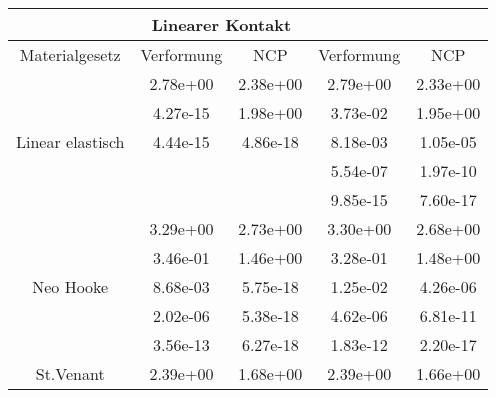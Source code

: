 \begin{table} 
\centering 
\begin{tabular}{c|cc|cc|} 
\cline{2-5} 
 & \multicolumn{2}{|c|}{Linearer Kontakt} &  \\ 
\hline 
\multicolumn{1}{|c|}{Materialgesetz} & \multicolumn{1}{c|}{Verformung} & \multicolumn{1}{c|}{NCP} & \multicolumn{1}{c|}{Verformung} & \multicolumn{1}{c|}{NCP} \\ 
\hline 
\multicolumn{1}{|c|}{\multirow{5}{*}{Linear elastisch}} &\multicolumn{1}{|c|}{  2.78e+00} & \multicolumn{1}{|c|}{  2.38e+00} & \multicolumn{1}{|c|}{  2.79e+00} & \multicolumn{1}{|c|}{  2.33e+00} \\ 
\multicolumn{1}{|c|}{} & \multicolumn{1}{|c|}{  4.27e-15} & \multicolumn{1}{|c|}{  1.98e+00} & \multicolumn{1}{|c|}{  3.73e-02} & \multicolumn{1}{|c|}{  1.95e+00} \\ 
\multicolumn{1}{|c|}{} & \multicolumn{1}{|c|}{  4.44e-15} & \multicolumn{1}{|c|}{  4.86e-18} & \multicolumn{1}{|c|}{  8.18e-03} & \multicolumn{1}{|c|}{  1.05e-05} \\ 
\multicolumn{1}{|c|}{} & \multicolumn{1}{|c|}{} & \multicolumn{1}{|c|}{} & \multicolumn{1}{|c|}{  5.54e-07} & \multicolumn{1}{|c|}{  1.97e-10} \\ 
\multicolumn{1}{|c|}{} & \multicolumn{1}{|c|}{} & \multicolumn{1}{|c|}{} & \multicolumn{1}{|c|}{  9.85e-15} & \multicolumn{1}{|c|}{  7.60e-17} \\ 
\hline 
\multicolumn{1}{|c|}{\multirow{5}{*}{Neo Hooke}} &\multicolumn{1}{|c|}{  3.29e+00} & \multicolumn{1}{|c|}{  2.73e+00} & \multicolumn{1}{|c|}{  3.30e+00} & \multicolumn{1}{|c|}{  2.68e+00} \\ 
\multicolumn{1}{|c|}{} & \multicolumn{1}{|c|}{  3.46e-01} & \multicolumn{1}{|c|}{  1.46e+00} & \multicolumn{1}{|c|}{  3.28e-01} & \multicolumn{1}{|c|}{  1.48e+00} \\ 
\multicolumn{1}{|c|}{} & \multicolumn{1}{|c|}{  8.68e-03} & \multicolumn{1}{|c|}{  5.75e-18} & \multicolumn{1}{|c|}{  1.25e-02} & \multicolumn{1}{|c|}{  4.26e-06} \\ 
\multicolumn{1}{|c|}{} & \multicolumn{1}{|c|}{  2.02e-06} & \multicolumn{1}{|c|}{  5.38e-18} & \multicolumn{1}{|c|}{  4.62e-06} & \multicolumn{1}{|c|}{  6.81e-11} \\ 
\multicolumn{1}{|c|}{} & \multicolumn{1}{|c|}{  3.56e-13} & \multicolumn{1}{|c|}{  6.27e-18} & \multicolumn{1}{|c|}{  1.83e-12} & \multicolumn{1}{|c|}{  2.20e-17} \\ 
\hline 
\multicolumn{1}{|c|}{\multirow{8}{*}{St.Venant}} &\multicolumn{1}{|c|}{  2.39e+00} & \multicolumn{1}{|c|}{  1.68e+00} & \multicolumn{1}{|c|}{  2.39e+00} & \multicolumn{1}{|c|}{  1.66e+00} \\ 

\end{tabular}
\end{table}
